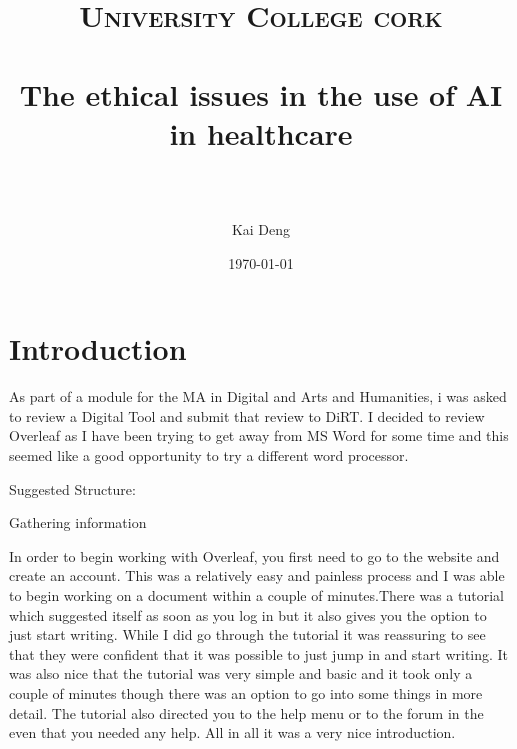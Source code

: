 \documentclass[paper=a4, fontsize=11pt]{scrartcl} %
\title{ 

\normalfont \normalsize 

\textsc{University College cork} \\ [25pt] %

\horrule{0.5pt} \\[0.4cm] %

\huge The ethical issues in the use of AI in healthcare \\ %

\horrule{2pt} \\[0.5cm] %

}
\author{Kai Deng} %
\date{\normalsize\today} %
\numberwithin{equation}{section} %
\numberwithin{figure}{section} %
\numberwithin{table}{section} %
\begin{document}
\maketitle %








\section{Introduction}








As part of a module for the MA in Digital and Arts and Humanities, i was asked to review a Digital Tool and submit that review to DiRT. I decided to review Overleaf as I have been trying to get away from MS Word for some time and this seemed like a good opportunity to try a different word processor.





Suggested Structure:

Gathering information

In order to begin working with Overleaf, you first need to go to the website and create an account. This was a relatively easy and painless process and I was able to begin working on a document within a couple of minutes.There was a tutorial which suggested itself as soon as you log in but it also gives you the option to just start writing. While I did go through the tutorial it was reassuring to see that they were confident that it was possible to just jump in and start writing. It was also nice that the tutorial was very simple and basic and it took only a couple of minutes though there was an option to go into some things in more detail. The tutorial also directed you to the help menu or to the forum in the even that you needed any help. All in all it was a very nice introduction.
\end{document}
